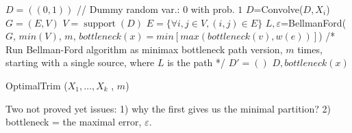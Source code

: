 \documentclass[review]{elsarticle}
\DeclareMathOperator{\support}{support}
\begin{document}
\begin{algorithm}
  \DontPrintSemicolon

   $D=((0,1))$ //  Dummy random var.: $0$ with prob. $1$ \;
   {
	$D$=Convolve($D, X_i$)\; 
	}
   $G=(E,V)$ \;
   $V = \support(D)$\;
   $E = \{\forall i,j \in V, (i,j)\in E\}$\;
   $L, \varepsilon$=BellmanFord($G$, $min(V)$, $m$, $bottleneck(x) =    min   [max(bottleneck(v),w(e))]$) /* Run Bellman-Ford algorithm as minimax bottleneck path version, $m$ times, starting with a single source, where $L$ is the path */ \;
   $D'=()$\;
   \Return $D, bottleneck(x)$\;
     
\caption{OptimalTrim ($X_1,\dots,X_k$ , $m$)}  
\label{alg:sequence}
\end{algorithm}


Two not proved yet issues:
1) why the first gives us the minimal partition? 2) bottleneck  = the maximal error, $\varepsilon$.
\end{document}
